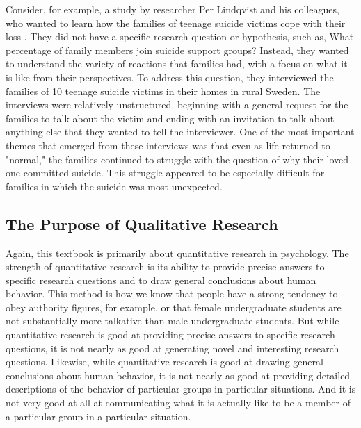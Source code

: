 Consider, for example, a study by researcher Per Lindqvist and his colleagues, who wanted to learn how the families of teenage suicide victims cope with their loss \citep{lindqvist_aftermath_2008}. They did not have a specific research question or hypothesis, such as, What percentage of family members join suicide support groups? Instead, they wanted to understand the variety of reactions that families had, with a focus on what it is like from their perspectives. To address this question, they interviewed the families of 10 teenage suicide victims in their homes in rural Sweden. The interviews were relatively unstructured, beginning with a general request for the families to talk about the victim and ending with an invitation to talk about anything else that they wanted to tell the interviewer. One of the most important themes that emerged from these interviews was that even as life returned to "normal," the families continued to struggle with the question of why their loved one committed suicide. This struggle appeared to be especially difficult for families in which the suicide was most unexpected.

\subsection{The Purpose of Qualitative Research}

Again, this textbook is primarily about quantitative research in psychology. The strength of quantitative research is its ability to provide precise answers to specific research questions and to draw general conclusions about human behavior. This method is how we know that people have a strong tendency to obey authority figures, for example, or that female undergraduate students are not substantially more talkative than male undergraduate students. But while quantitative research is good at providing precise answers to specific research questions, it is not nearly as good at generating novel and interesting research questions. Likewise, while quantitative research is good at drawing general conclusions about human behavior, it is not nearly as good at providing detailed descriptions of the behavior of particular groups in particular situations. And it is not very good at all at communicating what it is actually like to be a member of a particular group in a particular situation.


